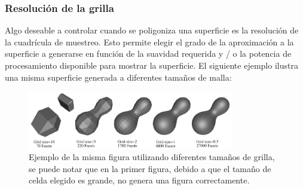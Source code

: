 \documentclass[12pt]{article}
\begin{document}
\subsubsection{Resolución de la grilla}
Algo deseable a controlar cuando se poligoniza una superficie es la resolución de la cuadrícula de muestreo. Esto permite elegir el grado de la aproximación a la superficie a generarse en función de la suavidad requerida y / o la potencia de procesamiento disponible para mostrar la superficie. El siguiente ejemplo ilustra una misma superficie generada a diferentes tamaños de malla:
\clearpage
\begin{figure}[h!]
\includegraphics[width=0.8\textwidth,center]{marchingcubes4.png}
\caption{Ejemplo de la misma figura utilizando diferentes tamaños de grilla, se puede notar que en la primer figura, debido a que el tamaño de celda elegido es grande, no genera una figura correctamente.}
\end{figure}
\end{document}
